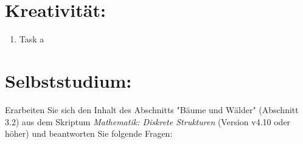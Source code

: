 \begin{enumerate}[label=(\alph*)]
\\\\
    \end{enumerate}
    \section*{Kreativität:}
    \begin{enumerate}[label=(\alph*)]
        \item Task a
    \end{enumerate}
    \section*{Selbststudium:}
        Erarbeiten Sie sich den Inhalt des Abschnitts "Bäume und Wälder" (Abschnitt 3.2) aus dem
        Skriptum \textit{Mathematik: Diskrete Strukturen} (Version v4.10 oder höher) und beantworten Sie
        folgende Fragen:
